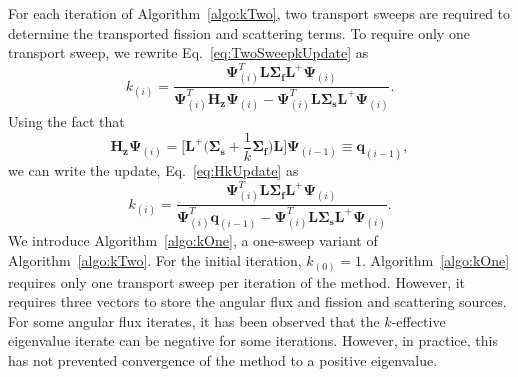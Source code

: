 For each iteration of Algorithm~\ref{algo:kTwo}, two transport sweeps are required to determine the transported fission and scattering terms. To require only one transport sweep, we rewrite Eq.~\ref{eq:TwoSweepkUpdate} as
\begin{equation}
	k_{(i)} = \frac{\mathbf{\Psi}^{T}_{(i)} \mathbf{L} \mathbf{\Sigma_{f}} \mathbf{L}^{+} \mathbf{\Psi}_{(i)}}{\mathbf{\Psi}^{T}_{(i)}\mathbf{H}_{\mathbf{z}} \mathbf{\Psi}_{(i)} - \mathbf{\Psi}^{T}_{(i)} \mathbf{L} \mathbf{\Sigma_{s}} \mathbf{L}^{+} \mathbf{\Psi}_{(i)}}.
	\label{eq:HkUpdate}
\end{equation}
Using the fact that
\begin{equation}
\mathbf{H_{z}} \mathbf{\Psi}_{(i)} =  \bigg [ \mathbf{L}^{+} \bigg ( \mathbf{\Sigma_{s}} + \frac{1}{k}\mathbf{\Sigma_{f}} \bigg ) \mathbf{L} \bigg ] \mathbf{\Psi}_{(i-1)} \equiv \mathbf{q}_{(i-1)},
\end{equation}
we can write the update, Eq.~\ref{eq:HkUpdate} as
\begin{equation}
	k_{(i)} = \frac{\mathbf{\Psi}^{T}_{(i)} \mathbf{L} \mathbf{\Sigma_{f}} \mathbf{L}^{+} \mathbf{\Psi}_{(i)}}{\mathbf{\Psi}^{T}_{(i)}\mathbf{q}_{(i-1)} - \mathbf{\Psi}^{T}_{(i)} \mathbf{L} \mathbf{\Sigma_{s}} \mathbf{L}^{+} \mathbf{\Psi}_{(i)}}.
	\label{eq:HkUpdate}
\end{equation}
We introduce Algorithm~\ref{algo:kOne}, a one-sweep variant of Algorithm~\ref{algo:kTwo}. For the initial iteration, $k_{(0)} = 1$. Algorithm~\ref{algo:kOne} requires only one transport sweep per iteration of the method. However, it requires three vectors to store the angular flux and fission and scattering sources. For some angular flux iterates, it has been observed that the $k$-effective eigenvalue iterate can be negative for some iterations. However, in practice, this has not prevented convergence of the method to a positive eigenvalue.
